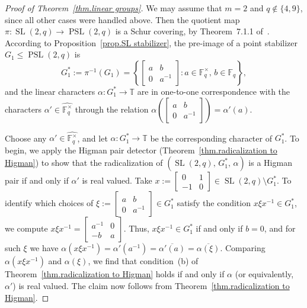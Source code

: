 \documentclass[11pt]{article}
\theoremstyle{definition}
\numberwithin{equation}{section}
\begin{document}
\begin{proof}[Proof of Theorem~\ref{thm.linear groups}]
We may assume that $m=2$ and $q \notin \{ 4,9 \}$, since all other cases were handled above.
Then the quotient map $\pi \colon \operatorname{SL}(2,q) \to \operatorname{PSL}(2,q)$ is a Schur covering, by Theorem~7.1.1 of~\cite{Karpilovsky:87}.
According to Proposition~\ref{prop.SL stabilizer}, the pre-image of a point stabilizer $G_1 \leq \operatorname{PSL}(2,q)$ is
\[ G_1^* := \pi^{-1}(G_1) = \left\{ \begin{bmatrix} a & b \\ 0 & a^{-1} \end{bmatrix} : a \in \mathbb{F}_q^\times,\, b \in \mathbb{F}_q \right\}, \]
and the linear characters $\alpha \colon G_1^* \to \mathbb{T}$ are in one-to-one correspondence with the characters $\alpha' \in \widehat{ \mathbb{F}_q^\times }$ through the relation $\alpha\left( \begin{bmatrix} a & b \\ 0 & a^{-1} \end{bmatrix} \right) = \alpha'(a)$.

Choose any $\alpha' \in \widehat{ \mathbb{F}_q^\times }$, and let $\alpha \colon G_1^* \to \mathbb{T}$ be the corresponding character of $G_1^*$.
To begin, we apply the Higman pair detector (Theorem~\ref{thm.radicalization to Higman}) to show that the radicalization of $( \operatorname{SL}(2,q),\, G_1^*,\, \alpha)$ is a Higman pair if and only if $\alpha'$ is real valued.
Take $x := \begin{bmatrix} 0 & 1 \\ -1 & 0 \end{bmatrix} \in \operatorname{SL}(2,q) \setminus G_1^*$.
To identify which choices of $\xi := \begin{bmatrix} a & b \\ 0 & a^{-1} \end{bmatrix} \in G_1^*$ satisfy the condition $x \xi x^{-1} \in G_1^*$, we compute $x \xi x^{-1} = \begin{bmatrix} a^{-1} & 0 \\ -b & a \end{bmatrix}$.
Thus, $x\xi x^{-1} \in G_1^*$ if and only if $b = 0$, and for such $\xi$ we have $\alpha(x\xi x^{-1}) = \alpha'(a^{-1}) = \overline{ \alpha'(a) } = \overline{\alpha(\xi)}$.
Comparing $\alpha(x \xi x^{-1})$ and $\alpha(\xi)$, we find that condition~(b) of Theorem~\ref{thm.radicalization to Higman} holds if and only if $\alpha$ (or equivalently, $\alpha'$) is real valued.
The claim now follows from Theorem~\ref{thm.radicalization to Higman}.


\end{proof}
\end{document}
